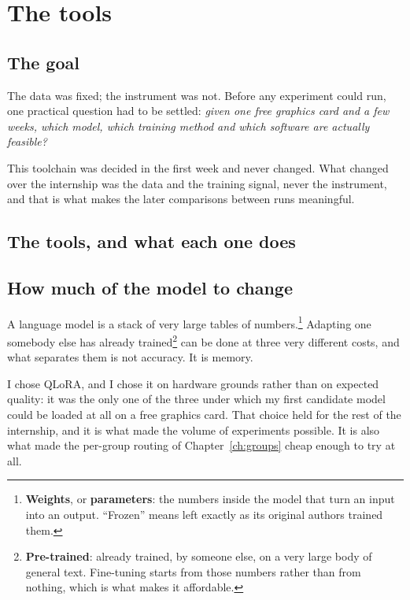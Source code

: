 \chapter{The tools}
\label{ch:tools}

\section{The goal}

The data was fixed; the instrument was not. Before any experiment could run, one
practical question had to be settled: \emph{given one free graphics card and a
few weeks, which model, which training method and which software are actually
feasible?}

This toolchain was decided in the first week and never changed. What changed over
the internship was the data and the training signal, never the instrument, and
that is what makes the later comparisons between runs meaningful.

\section{The tools, and what each one does}



\section{How much of the model to change}
\label{sec:tools-peft}

A language model is a stack of very large tables of
numbers.\footnote{\textbf{Weights}, or \textbf{parameters}: the numbers inside
the model that turn an input into an output. ``Frozen'' means left exactly as its
original authors trained them.} Adapting one somebody else has already
trained\footnote{\textbf{Pre-trained}: already trained, by someone else, on a very
large body of general text. Fine-tuning starts from those numbers rather than
from nothing, which is what makes it affordable.} can be done at three very
different costs, and what separates them is not accuracy. It is memory.



I chose QLoRA, and I chose it on hardware grounds rather than on expected
quality: it was the only one of the three under which my first candidate model
could be loaded at all on a free graphics card. That choice held for the rest of
the internship, and it is what made the volume of experiments possible. It is
also what made the per-group routing of Chapter~\ref{ch:groups} cheap enough to
try at all.

